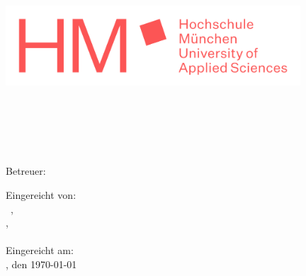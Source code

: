 \begin{titlepage}
    \pagestyle{empty}
    
    \begin{center}	
    
    \includegraphics[height=3cm]{content/pictures/hm.png}
    
    \vspace{1cm}

    \docFakultaet\\
    \docStudiengang\\

    \vspace{3cm}
    {\huge \docArtDerArbeit}\\

    \vspace{2cm}
    {\Huge \docTitle}\\
    \vspace{0.5cm}

    \vspace{2cm}
    Betreuer: \docErsterReferent\\

    \end{center}

    \vspace{2cm}
    \begin{flushright}
    Eingereicht von: \\
    \docVorname~\docNachname, \docMatrikelnummer\\
    \docStrasse,~\docPlz~\docOrt\\
    \docEmail\\


    \vspace{0.5cm}
    Eingereicht am:\\
    \docOrt, den \today
    \end{flushright}

    \end{titlepage}
